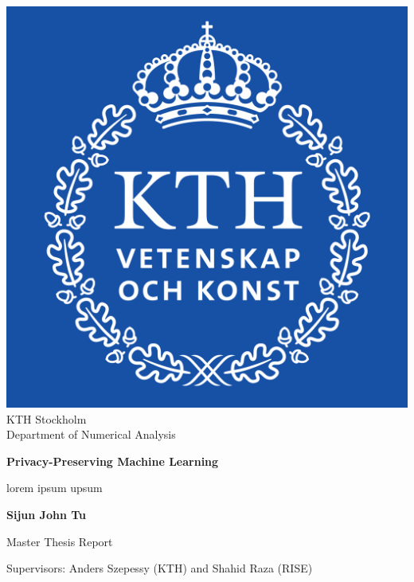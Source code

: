 \begin{titlepage}
	\begin{center}
		\vspace*{1cm}
		\includegraphics[scale=0.1]{pictures/KTH_Royal_Institute_of_Technology_logo.svg.png}\\
		\Large
		KTH Stockholm\\
		Department of Numerical Analysis
		\vspace*{1cm}



		\Huge
		\textbf{Privacy-Preserving Machine Learning}
		
		\vspace{0.5cm}
		\LARGE
		lorem ipsum upsum
		
		\vspace{1.5cm}
		
		\textbf{Sijun John Tu}
		
		\vfill
		
		Master Thesis Report \\
		
		\vspace{0.8cm}

		
		\large
		Supervisors: Anders Szepessy (KTH) and Shahid Raza (RISE)\\
		
	\end{center}
\end{titlepage}